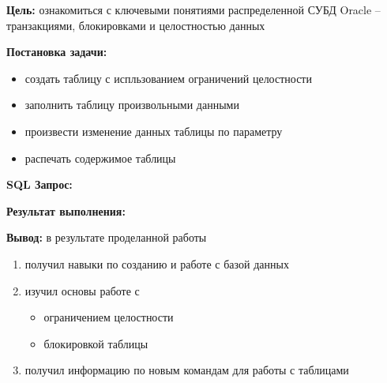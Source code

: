 \documentclass[pscyr, 12pt]{hedlab}
\begin{document}
    \makeheader
    \noindent\textbf{Цель:} ознакомиться с ключевыми понятиями распределенной СУБД Oracle -- транзакциями, блокировками и целостностью данных

    \noindent\textbf{Постановка задачи:}
    \vspace*{-1em}
    \begin{itemize}\itemsep-5pt
        \item создать таблицу с испльзованием ограничений целостности
        \item заполнить таблицу произвольными данными
        \item произвести изменение данных таблицы по параметру
        \item распечать содержимое таблицы
    \end{itemize}
  
    \noindent\textbf{SQL Запрос:}
    

    \pagebreak

    \noindent\textbf{Результат выполнения:}
    

    \noindent\textbf{Вывод:} в результате проделанной работы\vspace*{-0.5em}
    \begin{enumerate}\itemsep-5pt
        \item получил навыки по созданию и работе с базой данных
        \item изучил основы работе с\vspace*{-1em}
        \begin{itemize}\itemsep-5pt
            \item ограничением целостности
            \item блокировкой таблицы
        \end{itemize}\vspace*{-0.5em}
        \item получил информацию по новым командам для работы с таблицами
    \end{enumerate}
\end{document}
